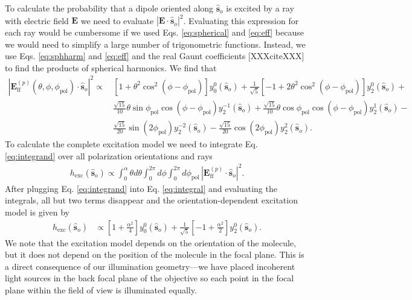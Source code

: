 \documentclass{osa-article}
\providecommand{\mb}[1]{\mathbf{#1}}
\providecommand{\so}[1]{\mathbf{\hat{s}}_o}
\begin{document}
To calculate the probability that a dipole oriented along $\so{}$ is excited by
a ray with electric field $\mb{E}$ we need to evaluate $|\mb{E}\cdot\so{}|^2$.
Evaluating this expression for each ray would be cumbersome if we used Eqs.
\ref{eq:spherical} and \ref{eq:eff} because we would need to simplify a large
number of trigonometric functions. Instead, we use Eqs. \ref{eq:sphharm} and
\ref{eq:eff} and the real Gaunt coefficients [XXXciteXXX] to find the products
of spherical harmonics. We find that
\begin{align}
  |\mb{E}_{\text{ff}}^{(p)}(\theta, \phi, \phi_{\text{pol}}) \cdot \so{}|^2 \propto\, &\left[1 + \theta^2\cos^2(\phi - \phi_{\text{pol}})\right]y_0^0(\so{}) + \frac{1}{\sqrt{5}}\left[ - 1 + 2\theta^2\cos^2(\phi - \phi_{\text{pol}})\right]y_2^{0}(\so{}) +\nonumber \\
                                   &\frac{\sqrt{15}}{10}\theta\sin\phi_{\text{pol}}\cos(\phi - \phi_{\text{pol}})y_2^{-1}(\so{}) + \frac{\sqrt{15}}{10}\theta\cos\phi_{\text{pol}}\cos(\phi - \phi_{\text{pol}})y_2^{1}(\so{}) -\nonumber \\  
                                   &\frac{\sqrt{15}}{20}\sin(2\phi_{\text{pol}})y_2^{-2}(\so{}) - \frac{\sqrt{15}}{20}\cos(2\phi_{\text{pol}})y_2^{2}(\so{}).\label{eq:integrand}
\end{align}
To calculate the complete excitation model we need to integrate Eq.
\ref{eq:integrand} over all polarization orientations and rays
\begin{align}
  h_{\text{exc}}(\so{}) \propto \int_0^{\alpha}\theta d\theta\int_0^{2\pi}d\phi\int_0^{2\pi}d\phi_{\text{pol}}\, |\mb{E}_{\text{ff}}^{(p)} \cdot \so{}|^2. \label{eq:integral}
\end{align}
After plugging Eq. \ref{eq:integrand} into Eq. \ref{eq:integral} and evaluating
the integrals, all but two terms disappear and the orientation-dependent
excitation model is given by
\begin{align}
  h_{\text{exc}}(\so{}) &\propto \left[1 + \frac{\alpha^2}{4}\right]y_0^0(\so{}) + \frac{1}{\sqrt{5}}\left[-1 + \frac{\alpha^2}{2}\right]y_2^0(\so{}). \label{eq:excitation}
\end{align}
We note that the excitation model depends on the orientation of the molecule,
but it does not depend on the position of the molecule in the focal plane. This
is a direct consequence of our illumination geometry---we have placed incoherent
light sources in the back focal plane of the objective so each point in the
focal plane within the field of view is illuminated equally.
\end{document}
